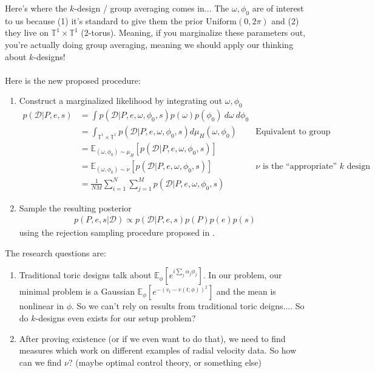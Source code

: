 \documentclass{article}
\begin{document}
Here's where the $k$-design / group averaging comes in... The $\omega,\phi_0$ are of interest to us because (1) it's standard \cite{Price_Whelan_2017} to give them the prior $\text{Uniform}(0, 2\pi)$ and (2) they live on $\mathbb T^1 \times \mathbb T^1$ (2-torus). Meaning, if you marginalize these parameters out, you're actually doing group averaging, meaning we should apply our thinking about $k$-designs! 
\\
\\
Here is the new proposed procedure:
\begin{enumerate}
	\item Construct a marginalized likelihood by integrating out $\omega, \phi_0$
	\begin{align}
		p(\mathcal D | P, e, s) & = \int p(\mathcal D| P, e, \omega, \phi_0, s)  p(\omega) p(\phi_0) ~d\omega ~ d\phi_0\\
		& = \int_{\mathbb T^1 \times \mathbb T^1} p(\mathcal D| P, e, \omega, \phi_0, s) d\mu_H(\omega, \phi_0) & \text{Equivalent to group average}\\
		& = \mathbb E_{(\omega, \phi_0) \sim \mu_H} [ p(\mathcal D| P, e, \omega, \phi_0, s)]\\
		& = \mathbb E_{(\omega, \phi_0) \sim \nu} [ p(\mathcal D| P, e, \omega, \phi_0, s)] & \nu \text{ is the ``appropriate'' $k$ design}\\
		& = \frac{1}{NM} \sum_{i=1}^N \sum_{j=1}^M  p(\mathcal D | P, e, \omega, \phi_0, s) 
	\end{align}
	\item Sample the resulting posterior
	\begin{align}
		p(P, e, s| \mathcal D) \propto p(\mathcal D | P, e, s) p(P) p(e) p(s)
	\end{align}
	 using the rejection sampling procedure proposed in \cite{Price_Whelan_2017}. 
\end{enumerate} 
The research questions are:
\begin{enumerate}
	\item Traditional toric designs talk about $\mathbb E_{\phi}[e^{i \sum_j \alpha_j \phi_j}]$. In our problem, our minimal problem is a Gaussian $\mathbb E_{\phi}[e^{-(v_t - v(t;\phi))^2}]$ and the mean is nonlinear in $\phi$. So we can't rely on results from traditional toric deigns.... So do $k$-designs even exists for our setup problem?
	\item After proving existence (or if we even want to do that), we need to find measures which work on different examples of radial velocity data. So how can we find $\nu$? (maybe optimal control theory, or something else)
\end{enumerate}


\newpage


\end{document}
